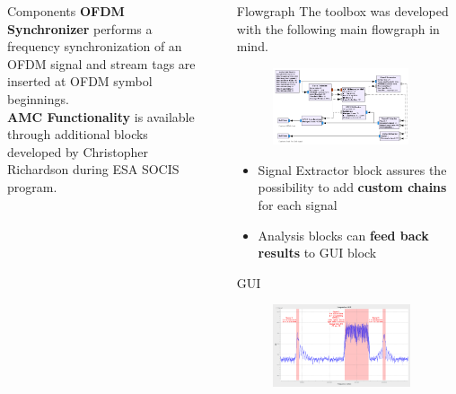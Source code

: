 \documentclass{beamer}
\begin{document}
\begin{frame}
\begin{columns}[t]
\begin{column}{0.33\textwidth}
\begin{block}{Components}
\textbf{OFDM Synchronizer}
performs a frequency synchronization of an OFDM signal and stream tags are inserted at OFDM symbol beginnings.\\[0.5em]

\textbf{AMC Functionality}
is available through additional blocks developed by Christopher Richardson during ESA SOCIS program.

\vspace{1.15em}
      \end{block}
    \end{column}
    \begin{column}{0.007\textwidth}
    \end{column}
    \begin{column}{0.68\textwidth}
      \begin{block}{Flowgraph}
        The toolbox was developed with the following main flowgraph in mind.
        \begin{figure}
          \includegraphics[width=0.90\textwidth]{figures/poster}
        \end{figure}
        \begin{itemize}
          \item Signal Extractor block assures the possibility to add \textbf{custom chains} for each signal 
          \item Analysis blocks can \textbf{feed back results} to GUI block
        \end{itemize}
      \end{block}
      \begin{block}{GUI}
      \begin{figure}
        \includegraphics[width=0.91\textwidth]{figures/gui3.png}%

\end{figure}
\end{block}
\end{column}
\end{columns}
\end{frame}
\end{document}
